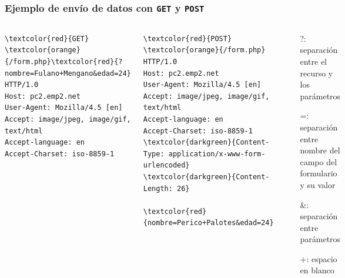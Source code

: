 \documentclass[hyperref={pdfpagelabels=true},ucs]{beamer}
\begin{document}
\begin{frame}[fragile]
\frametitle{Ejemplo de envío de datos con \texttt{GET} y \texttt{POST}}

\begin{columns}[c]

\column{85mm}

\begin{scriptsize}
\begin{Verbatim}
\textcolor{red}{GET} \textcolor{orange}{/form.php}\textcolor{red}{?nombre=Fulano+Mengano&edad=24} HTTP/1.0
Host: pc2.emp2.net
User-Agent: Mozilla/4.5 [en]
Accept: image/jpeg, image/gif, text/html
Accept-language: en
Accept-Charset: iso-8859-1

\end{Verbatim}
\end{scriptsize}

\begin{scriptsize}
\begin{Verbatim}
\textcolor{red}{POST} \textcolor{orange}{/form.php} HTTP/1.0
Host: pc2.emp2.net
User-Agent: Mozilla/4.5 [en]
Accept: image/jpeg, image/gif, text/html
Accept-language: en
Accept-Charset: iso-8859-1
\textcolor{darkgreen}{Content-Type: application/x-www-form-urlencoded}
\textcolor{darkgreen}{Content-Length: 26}

\textcolor{red}{nombre=Perico+Palotes&edad=24}
\end{Verbatim}
\end{scriptsize}

\column{35mm}

\begin{scriptsize}
\begin{itemize}
\item[?:] separación entre el recurso y los parámetros
\item[=:] separación entre nombre del campo del formulario y su
  valor
\item[\&:] separación entre parámetros
\item[+:] espacio en blanco
\end{itemize}
\end{scriptsize}

\end{columns}


\end{frame}

\end{document}
